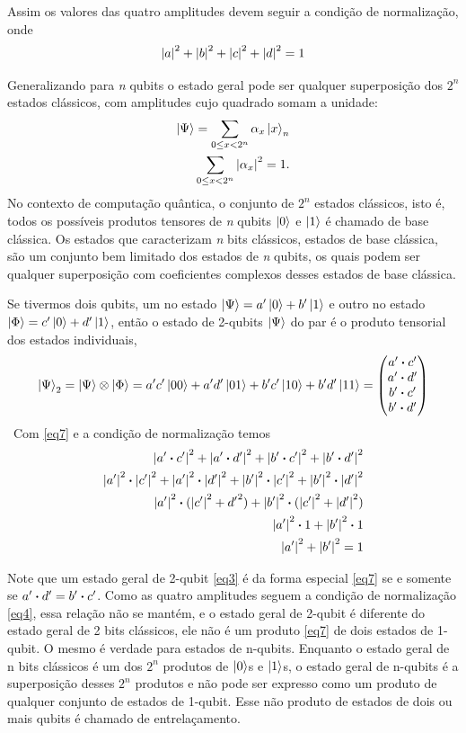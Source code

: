 \documentclass[a4paper, 12pt, oneside]{book}
\begin{document}
Assim os valores das quatro amplitudes devem seguir a condição de normalização, onde
\begin{equation}\label{eq4}
\abs{a}^2 + \abs{b}^2 + \abs{c}^2 + \abs{d}^2 = 1
\end{equation}

Generalizando para \textit{n} qubits o estado geral pode ser qualquer superposição dos $2^n$ estados clássicos, com amplitudes cujo quadrado somam a unidade:
\begin{align*}
\ket{\Psi} = \sum_{0\leq x<2^n} \alpha_x\ket{x}_n \\
\sum_{0\leq x<2^n} \abs{\alpha_x}^2 = 1.
\end{align*}
No contexto de computação quântica, o conjunto de $2^n$ estados clássicos, isto é, todos os possíveis produtos tensores de \textit{n} qubits $\ket{0}$ e $\ket{1}$ é chamado de base clássica. Os estados que caracterizam \textit{n} bits clássicos, estados de base clássica, são um conjunto bem limitado dos estados de \textit{n} qubits, os quais podem ser qualquer superposição com coeficientes complexos desses estados de base clássica.

Se tivermos dois qubits, um no estado $\ket{\Psi} = a'\ket{0} + b'\ket{1}$ e outro no estado $\ket{\Phi} = c'\ket{0} + d'\ket{1}$, então o estado de 2-qubits $\ket{\Psi}$ do par é o produto tensorial dos estados individuais,
\begin{equation}\label{eq7}
\ket{\Psi}_2 = \ket{\Psi}\otimes\ket{\Phi} 
= a'c'\ket{00} + a'd'\ket{01} + b'c'\ket{10} + b'd'\ket{11}
= \mqty(a' \vdot c'\\a' \vdot d'\\b' \vdot c'\\b' \vdot d')
\end{equation}\
Com \eqref{eq7} e a condição de normalização temos
\begin{align*}
\abs{a' \vdot c'}^2 + \abs{a' \vdot d'}^2 + \abs{b' \vdot c'}^2 + \abs{b' \vdot d'}^2 \\
\abs{a'}^2 \vdot \abs{c'}^2 + \abs{a'}^2 \vdot \abs{d'}^2 + \abs{b'}^2 \vdot \abs{c'}^2 + \abs{b'}^2 \vdot \abs{d'}^2 \\
\abs{a'}^2 \vdot (\abs{c'}^2 + {d'}^2) + \abs{b'}^2 \vdot (\abs{c'}^2 + \abs{d'}^2) \\
\abs{a'}^2 \vdot 1 + \abs{b'}^2 \vdot 1 \\
\abs{a'}^2 + \abs{b'}^2 = 1
\end{align*}

Note que um estado geral de 2-qubit \eqref{eq3} é da forma especial \eqref{eq7} se e somente se $a'\vdot d'=b'\vdot c'$. Como as quatro amplitudes seguem a condição de normalização \eqref{eq4}, essa relação não se mantém, e o estado geral de 2-qubit é diferente do estado geral de 2 bits clássicos, ele não é um produto \eqref{eq7} de dois estados de 1-qubit. O mesmo é verdade para estados de n-qubits. Enquanto o estado geral de n bits clássicos é um dos $2^n$ produtos de $\ket{0}$s e $\ket{1}$s, o estado geral de n-qubits é a superposição desses $2^n$ produtos e não pode ser expresso como um produto de qualquer conjunto de estados de 1-qubit. Esse não produto de estados de dois ou mais qubits é chamado de entrelaçamento.
\end{document}
